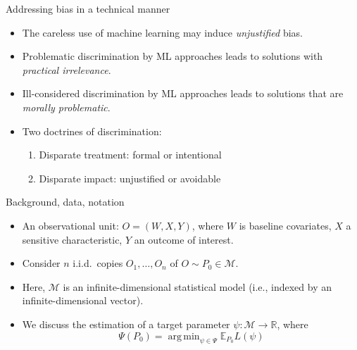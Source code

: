 \documentclass[12pt,t]{beamer}
\newcommand{\E}{\mathbb{E}}
\DeclareMathOperator*{\argmin}{arg\,min}
\begin{document}

\begin{frame}[c]{Addressing bias in a technical manner}

\begin{center}
\begin{itemize}
  \itemsep12pt
  \item The careless use of machine learning may induce \textit{unjustified}
    bias.
  \item Problematic discrimination by ML approaches leads to solutions with
    \textit{practical irrelevance}.
  \item Ill-considered discrimination by ML approaches leads to solutions that
    are \textit{morally problematic}.
  \item Two doctrines of discrimination:
    \begin{enumerate}
      \item Disparate treatment: formal or intentional
      \item Disparate impact: unjustified or avoidable
    \end{enumerate}
\end{itemize}
\end{center}


\end{frame}


\begin{frame}[c]{Background, data, notation}

\begin{center}
\begin{itemize}
  \itemsep12pt
  \item An observational unit: $O = (W, X, Y)$, where $W$ is baseline
    covariates, $X$ a sensitive characteristic, $Y$ an outcome of interest.
  \item Consider $n$ i.i.d.~copies $O_1, \ldots, O_n$ of $O \sim P_0 \in
    \mathcal{M}$.
  \item Here, $\mathcal{M}$ is an infinite-dimensional statistical model (i.e.,
    indexed by an infinite-dimensional vector).
  \item We discuss the estimation of a target parameter $\psi : \mathcal{M}
    \rightarrow \mathbb{R}$, where
    $$\Psi(P_0) = \argmin_{\psi \in \Psi} \E_{P_0}L(\psi)$$
\end{itemize}
\end{center}


\end{frame}
\end{document}
